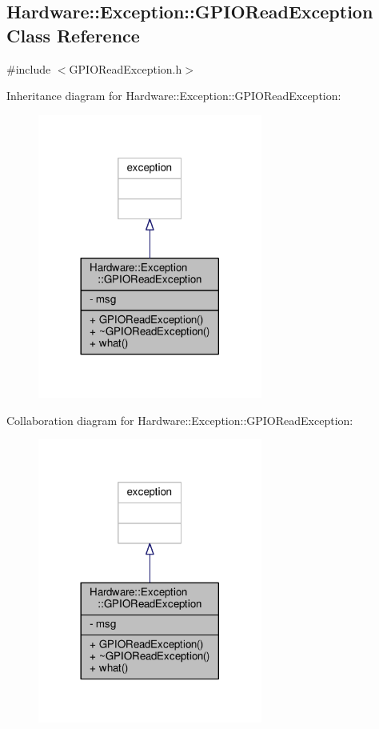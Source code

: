 \hypertarget{class_hardware_1_1_exception_1_1_g_p_i_o_read_exception}{}\subsection{Hardware\+:\+:Exception\+:\+:G\+P\+I\+O\+Read\+Exception Class Reference}
\label{class_hardware_1_1_exception_1_1_g_p_i_o_read_exception}


{\ttfamily \#include $<$G\+P\+I\+O\+Read\+Exception.\+h$>$}



Inheritance diagram for Hardware\+:\+:Exception\+:\+:G\+P\+I\+O\+Read\+Exception\+:
\nopagebreak
\begin{figure}[H]
\begin{center}
\leavevmode
\includegraphics[width=209pt]{class_hardware_1_1_exception_1_1_g_p_i_o_read_exception__inherit__graph}
\end{center}
\end{figure}


Collaboration diagram for Hardware\+:\+:Exception\+:\+:G\+P\+I\+O\+Read\+Exception\+:
\nopagebreak
\begin{figure}[H]
\begin{center}
\leavevmode
\includegraphics[width=209pt]{class_hardware_1_1_exception_1_1_g_p_i_o_read_exception__coll__graph}
\end{center}
\end{figure}
